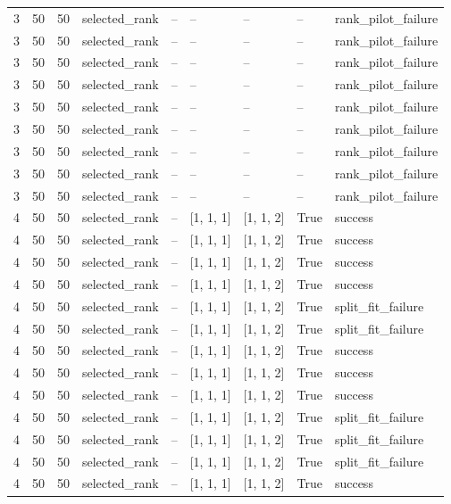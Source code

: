 \begin{longtable}{lllllllll}
3 & 50 & 50 & selected\_rank & -- & -- & -- & -- & rank\_pilot\_failure \\
3 & 50 & 50 & selected\_rank & -- & -- & -- & -- & rank\_pilot\_failure \\
3 & 50 & 50 & selected\_rank & -- & -- & -- & -- & rank\_pilot\_failure \\
3 & 50 & 50 & selected\_rank & -- & -- & -- & -- & rank\_pilot\_failure \\
3 & 50 & 50 & selected\_rank & -- & -- & -- & -- & rank\_pilot\_failure \\
3 & 50 & 50 & selected\_rank & -- & -- & -- & -- & rank\_pilot\_failure \\
3 & 50 & 50 & selected\_rank & -- & -- & -- & -- & rank\_pilot\_failure \\
3 & 50 & 50 & selected\_rank & -- & -- & -- & -- & rank\_pilot\_failure \\
3 & 50 & 50 & selected\_rank & -- & -- & -- & -- & rank\_pilot\_failure \\
4 & 50 & 50 & selected\_rank & -- & [1, 1, 1] & [1, 1, 2] & True & success \\
4 & 50 & 50 & selected\_rank & -- & [1, 1, 1] & [1, 1, 2] & True & success \\
4 & 50 & 50 & selected\_rank & -- & [1, 1, 1] & [1, 1, 2] & True & success \\
4 & 50 & 50 & selected\_rank & -- & [1, 1, 1] & [1, 1, 2] & True & success \\
4 & 50 & 50 & selected\_rank & -- & [1, 1, 1] & [1, 1, 2] & True & split\_fit\_failure \\
4 & 50 & 50 & selected\_rank & -- & [1, 1, 1] & [1, 1, 2] & True & split\_fit\_failure \\
4 & 50 & 50 & selected\_rank & -- & [1, 1, 1] & [1, 1, 2] & True & success \\
4 & 50 & 50 & selected\_rank & -- & [1, 1, 1] & [1, 1, 2] & True & success \\
4 & 50 & 50 & selected\_rank & -- & [1, 1, 1] & [1, 1, 2] & True & success \\
4 & 50 & 50 & selected\_rank & -- & [1, 1, 1] & [1, 1, 2] & True & split\_fit\_failure \\
4 & 50 & 50 & selected\_rank & -- & [1, 1, 1] & [1, 1, 2] & True & split\_fit\_failure \\
4 & 50 & 50 & selected\_rank & -- & [1, 1, 1] & [1, 1, 2] & True & split\_fit\_failure \\
4 & 50 & 50 & selected\_rank & -- & [1, 1, 1] & [1, 1, 2] & True & success \\

\end{longtable}
